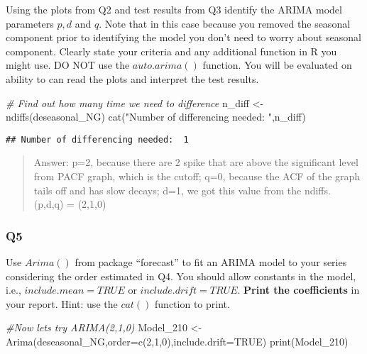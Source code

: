\documentclass[
]{article}
\newenvironment{Shaded}{\begin{snugshade}}{\end{snugshade}}
\newcommand{\AttributeTok}[1]{\textcolor[rgb]{0.77,0.63,0.00}{#1}}
\newcommand{\CommentTok}[1]{\textcolor[rgb]{0.56,0.35,0.01}{\textit{#1}}}
\newcommand{\ConstantTok}[1]{\textcolor[rgb]{0.00,0.00,0.00}{#1}}
\newcommand{\DecValTok}[1]{\textcolor[rgb]{0.00,0.00,0.81}{#1}}
\newcommand{\FunctionTok}[1]{\textcolor[rgb]{0.00,0.00,0.00}{#1}}
\newcommand{\NormalTok}[1]{#1}
\newcommand{\OtherTok}[1]{\textcolor[rgb]{0.56,0.35,0.01}{#1}}
\newcommand{\StringTok}[1]{\textcolor[rgb]{0.31,0.60,0.02}{#1}}
\begin{document}
Using the plots from Q2 and test results from Q3 identify the ARIMA
model parameters \(p,d\) and \(q\). Note that in this case because you
removed the seasonal component prior to identifying the model you don't
need to worry about seasonal component. Clearly state your criteria and
any additional function in R you might use. DO NOT use the
\(auto.arima()\) function. You will be evaluated on ability to can read
the plots and interpret the test results.

\begin{Shaded}
\begin{Highlighting}[]
\CommentTok{\# Find out how many time we need to difference}
\NormalTok{n\_diff }\OtherTok{\textless{}{-}} \FunctionTok{ndiffs}\NormalTok{(deseasonal\_NG)}
\FunctionTok{cat}\NormalTok{(}\StringTok{"Number of differencing needed: "}\NormalTok{,n\_diff) }
\end{Highlighting}
\end{Shaded}

\begin{verbatim}
## Number of differencing needed:  1
\end{verbatim}

\begin{quote}
Answer: p=2, because there are 2 spike that are above the significant
level from PACF graph, which is the cutoff; q=0, because the ACF of the
graph tails off and has slow decays; d=1, we got this value from the
ndiffs. (p,d,q) = (2,1,0)
\end{quote}

\hypertarget{q5}{%
\subsubsection{Q5}\label{q5}}

Use \(Arima()\) from package ``forecast'' to fit an ARIMA model to your
series considering the order estimated in Q4. You should allow constants
in the model, i.e., \(include.mean = TRUE\) or \(include.drift=TRUE\).
\textbf{Print the coefficients} in your report. Hint: use the \(cat()\)
function to print.

\begin{Shaded}
\begin{Highlighting}[]
\CommentTok{\#Now let\textquotesingle{}s try ARIMA(2,1,0)}
\NormalTok{Model\_210 }\OtherTok{\textless{}{-}} \FunctionTok{Arima}\NormalTok{(deseasonal\_NG,}\AttributeTok{order=}\FunctionTok{c}\NormalTok{(}\DecValTok{2}\NormalTok{,}\DecValTok{1}\NormalTok{,}\DecValTok{0}\NormalTok{),}\AttributeTok{include.drift=}\ConstantTok{TRUE}\NormalTok{)}
\FunctionTok{print}\NormalTok{(Model\_210)}
\end{Highlighting}
\end{Shaded}
\end{document}
